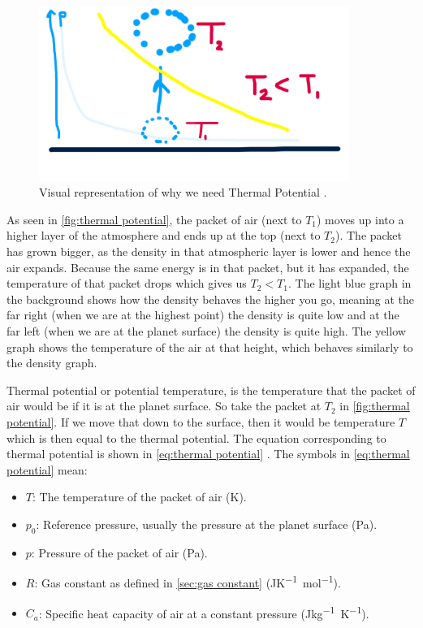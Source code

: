 \begin{figure}
    \centering
    \includegraphics[width=0.9\textwidth]{figures/potential_temperature.jpg}
    \caption{Visual representation of why we need Thermal Potential \cite{simon}.}
    \label{fig:thermal potential}
\end{figure}

As seen in \autoref{fig:thermal potential}, the packet of air (next to $T_1$) moves up into a higher layer of the atmosphere and ends up at the top (next to $T_2$). The packet has grown bigger, 
as the density in that atmospheric layer is lower and hence the air expands. Because the same energy is in that packet, but it has expanded, the temperature of that packet drops which gives us 
$T_2 < T_1$. The light blue graph in the background shows how the density behaves the higher you go, meaning at the far right (when we are at the highest point) the density is quite low and at 
the far left (when we are at the planet surface) the density is quite high. The yellow graph shows the temperature of the air at that height, which behaves similarly to the density graph.

Thermal potential or potential temperature, is the temperature that the packet of air would be if it is at the planet surface. So take the packet at $T_2$ in \autoref{fig:thermal potential}. If we move that down to the 
surface, then it would be temperature $T$ which is then equal to the thermal potential. The equation corresponding to thermal potential is shown in \autoref{eq:thermal potential} 
\cite{thermalPotential}. The symbols in \autoref{eq:thermal potential} mean:

\begin{itemize}
    \item $T$: The temperature of the packet of air (\si{K}).
    \item $p_0$: Reference pressure, usually the pressure at the planet surface (\si{Pa}).
    \item $p$: Pressure of the packet of air (\si{Pa}).
    \item $R$: Gas constant as defined in \autoref{sec:gas constant} (\si{JK^{-1}mol^{-1}}).
    \item $C_a$: Specific heat capacity of air at a constant pressure (\si{Jkg^{-1}K^{-1}}).
\end{itemize}

